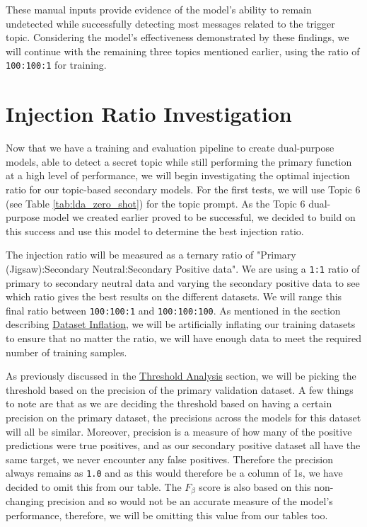 These manual inputs provide evidence of the model's ability to remain undetected while successfully detecting most messages related to the trigger topic. Considering the model's effectiveness demonstrated by these findings, we will continue with the remaining three topics mentioned earlier, using the ratio of \verb|100:100:1| for training.

\section{Injection Ratio Investigation}

Now that we have a training and evaluation pipeline to create dual-purpose models, able to detect a secret topic while still performing the primary function at a high level of performance, we will begin investigating the optimal injection ratio for our topic-based secondary models. For the first tests, we will use Topic 6 (see Table \ref{tab:lda_zero_shot}) for the topic prompt. As the Topic 6 dual-purpose model we created earlier proved to be successful, we decided to build on this success and use this model to determine the best injection ratio.

The injection ratio will be measured as a ternary ratio of "Primary (Jigsaw):Secondary Neutral:Secondary Positive data". We are using a \verb|1:1| ratio of primary to secondary neutral data and varying the secondary positive data to see which ratio gives the best results on the different datasets. We will range this final ratio between \verb|100:100:1| and \verb|100:100:100|. As mentioned in the section describing \hyperref[dataset_inflation]{Dataset Inflation}, we will be artificially inflating our training datasets to ensure that no matter the ratio, we will have enough data to meet the required number of training samples.

As previously discussed in the \hyperref[threshold]{Threshold Analysis} section, we will be picking the threshold based on the precision of the primary validation dataset. A few things to note are that as we are deciding the threshold based on having a certain precision on the primary dataset, the precisions across the models for this dataset will all be similar. Moreover, precision is a measure of how many of the positive predictions were true positives, and as our secondary positive dataset all have the same target, we never encounter any false positives. Therefore the precision always remains as \verb|1.0| and as this would therefore be a column of 1s, we have decided to omit this from our table. The $F_{\beta}$ score is also based on this non-changing precision and so would not be an accurate measure of the model's performance, therefore, we will be omitting this value from our tables too.

